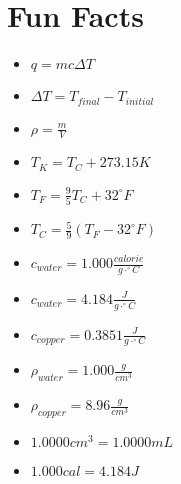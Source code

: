 \documentclass[11pt,addpoints]{exam}   	%
\begin{document}
\section*{Fun Facts}
\begin{multicols}{2}
\begin{itemize}
\item
$q = m c \Delta T$
\vspace{0.2in}

\item
$\Delta T = T_{final} - T_{initial}$
\vspace{0.2in}

\item
$\rho = \frac{m}{V} $
\vspace{0.2in}

\item
$T_K = T_C + 273.15 K$
\vspace{0.2in}

\item
$T_F = \frac{9}{5}T_C + 32^{\circ}F$
\vspace{0.2in}

\item
$T_C = \frac{5}{9}(T_F - 32^{\circ}F)$
\vspace{0.2in}

\item
$c_{water} = 1.000 \frac{calorie}{g \cdot ^{\circ}C}$
\vspace{0.2in}

\item
$c_{water} = 4.184 \frac{J}{g \cdot ^{\circ}C}$
\vspace{0.2in}

\item
$c_{copper} = 0.3851 \frac{J}{g \cdot ^{\circ}C}$
\vspace{0.2in}

\item
$\rho_{water} = 1.000 \frac{g}{cm^3}$
\vspace{0.2in}

\item
$\rho_{copper} = 8.96 \frac{g}{cm^3}$
\vspace{0.2in}

\item
$ 1.0000 cm^3 = 1.0000 mL $
\vspace{0.2in}

\item
$ 1.000 cal = 4.184 J $
\end{itemize}
\vspace{0.2in}

\end{multicols}
\end{document}
